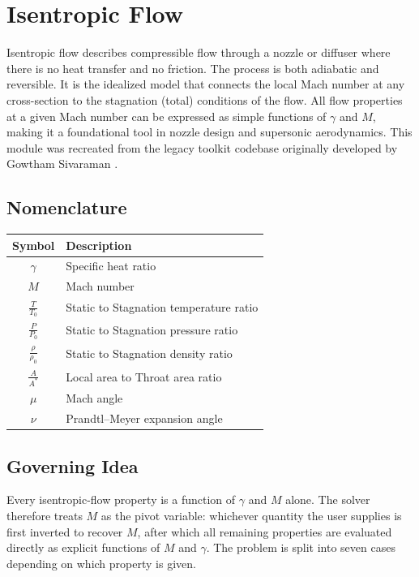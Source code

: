 \chapter{Isentropic Flow}

Isentropic flow describes compressible flow through a nozzle or diffuser where there is no heat transfer and no friction. The process is both adiabatic and reversible. It is the idealized model that connects the local Mach number at any cross-section to the stagnation (total) conditions of the flow. All flow properties at a given Mach number can be expressed as simple functions of $\gamma$ and $M$, making it a foundational tool in nozzle design and supersonic aerodynamics. This module was recreated from the legacy toolkit codebase originally developed by Gowtham Sivaraman \cite{sivaraman2015}.

\section{Nomenclature}

\begin{center}
\begin{tabular}{@{}cl@{}}
\toprule
Symbol & Description \\
\midrule
$\gamma$ & Specific heat ratio \\
$M$ & Mach number \\
$\frac{T}{T_0}$ & Static to Stagnation temperature ratio \\
$\frac{P}{P_0}$ & Static to Stagnation pressure ratio \\
$\frac{\rho}{\rho_0}$ & Static to Stagnation density ratio \\
$\frac{A}{A^*}$ & Local area to Throat area ratio \\
$\mu$ & Mach angle \\
$\nu$ & Prandtl--Meyer expansion angle \\
\bottomrule
\end{tabular}
\end{center}

\section{Governing Idea}

Every isentropic-flow property is a function of $\gamma$ and $M$ alone. The
solver therefore treats $M$ as the pivot variable: whichever quantity the
user supplies is first inverted to recover $M$, after which all remaining
properties are evaluated directly as explicit functions of $M$ and $\gamma$.
The problem is split into seven cases depending on which property is given.

